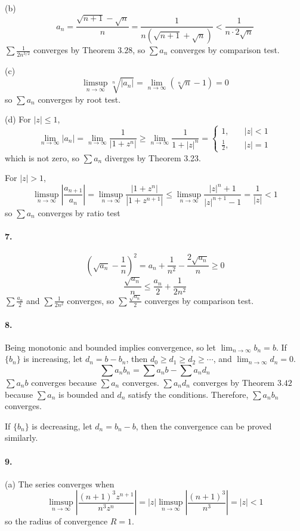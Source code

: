 \documentclass[a4paper]{article}
\begin{document}
(b)
\[
a_n=\frac{\sqrt{n+1}-\sqrt{n}}{n}=\frac{1}{n(\sqrt{n+1}+\sqrt{n})}<\frac{1}{n\cdot2\sqrt{n}}
\]
$\sum\frac{1}{2n^{3/2}}$ converges by Theorem $3.28$, so $\sum a_n$ converges by comparison test.
\medskip

(c)
\[
\limsup_{n\to\infty}\sqrt[n]{|a_n|}=\lim_{n\to\infty}(\sqrt[n]{n}-1)=0
\]
so $\sum a_n$ converges by root test.
\medskip

(d)
For $|z|\leq1$, 
\[
\lim_{n\to\infty}|a_n|=\lim_{n\to\infty}\frac{1}{|1+z^n|}\geq\lim_{n\to\infty}\frac{1}{1+|z|^n}=
\begin{cases}
1,\quad & |z|<1\\
\frac{1}{2},\quad & |z|=1
\end{cases}
\]
which is not zero, so $\sum a_n$ diverges by Theorem 3.23.

For $|z|>1$, 
\[
\limsup_{n\to\infty}\left|\frac{a_{n+1}}{a_n} \right|=\limsup_{n\to\infty}\frac{|1+z^n|}{|1+z^{n+1}|}\leq\limsup_{n\to\infty}\frac{|z|^n+1}{|z|^{n+1}-1}=\frac{1}{|z|}<1
\]
so $\sum a_n$ converges by ratio test

\paragraph{7.}
\[
(\sqrt{a_n}-\frac{1}{n})^2=a_n+\frac{1}{n^2}-\frac{2\sqrt{a_n}}{n}\geq0
\]
\[
\frac{\sqrt{a_n}}{n}\leq\frac{a_n}{2}+\frac{1}{2n^2}
\]
$\sum\frac{a_n}{2}$ and $\sum\frac{1}{2n^2}$ converges, so $\sum\frac{\sqrt{a_n}}{2}$ converges by comparison test.

\paragraph{8.}
Being monotonic and bounded implies convergence, so let $\lim_{n\to\infty}b_n=b$. If $\{b_n\}$ is increasing, let $d_n=b-b_n$, then $d_0\geq d_1\geq d_2\geq\cdots$, and $\lim_{n\to\infty}d_n=0$.
\[
\sum a_nb_n=\sum a_nb-\sum a_nd_n
\]
$\sum a_nb$ converges because $\sum a_n$ converges. $\sum a_nd_n$ converges by Theorem $3.42$ because $\sum a_n$ is bounded and $d_n$ satisfy the conditions. Therefore, $\sum a_nb_n$ converges.

If $\{b_n\}$ is decreasing, let $d_n=b_n-b$, then the convergence can be proved similarly.

\paragraph{9.}
(a)
The series converges when 
\[
\limsup_{n\to\infty}\left|\frac{(n+1)^3z^{n+1}}{n^3z^n} \right|=|z|\limsup_{n\to\infty}\left|\frac{(n+1)^3}{n^3} \right|=|z|<1
\]
so the radius of convergence $R=1$.
\medskip
\end{document}
